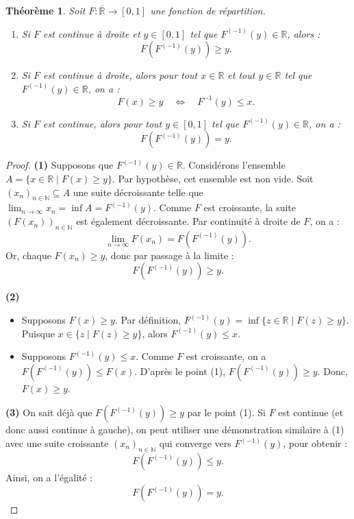 \documentclass[a4paper,11pt]{amsbook}
\numberwithin{equation}{chapter}
\newtheorem{theoreme}			     {Théorème}	[chapter]
\theoremstyle{definition}
\begin{document}
\begin{theoreme}\label{thm:quasi}
Soit \( F : \overline{\mathbb{R}} \to [0,1] \) une fonction de répartition.

\begin{enumerate}
    \item Si \( F \) est continue à droite et \( y \in [0,1] \) tel que \( F^{(-1)}(y) \in \mathbb{R} \), alors :
    \[
    F(F^{(-1)}(y)) \geq y.
    \]

    \item Si \( F \) est continue à droite, alors pour tout \( x \in \mathbb{R} \) et tout \( y \in \mathbb{R} \) tel que \( F^{(-1)}(y) \in \mathbb{R} \), on a :
    \[
    F(x) \geq y \quad \Leftrightarrow \quad F^{-1}(y) \leq x.
    \]

    \item Si \( F \) est continue, alors pour tout \( y \in [0,1] \) tel que \( F^{(-1)}(y) \in \mathbb{R} \), on a :
    \[
    F(F^{(-1)}(y)) = y.
    \]
\end{enumerate}
\end{theoreme}

\begin{proof}
\textbf{(1)} Supposons que \( F^{(-1)}(y) \in \mathbb{R} \). Considérons l'ensemble \( A = \{ x \in \mathbb{R} \mid F(x) \geq y \} \). Par hypothèse, cet ensemble est non vide.  
Soit \( (x_n)_{n \in \mathbb{N}} \subseteq A \) une suite décroissante telle que \( \lim_{n \to \infty} x_n = \inf A = F^{(-1)}(y) \).  
Comme \( F \) est croissante, la suite \( (F(x_n))_{n \in \mathbb{N}} \) est également décroissante.  
Par continuité à droite de \( F \), on a :
\[
\lim_{n \to \infty} F(x_n) = F(F^{(-1)}(y)).
\]
Or, chaque \( F(x_n) \geq y \), donc par passage à la limite :
\[
F(F^{(-1)}(y)) \geq y.
\]

\vspace{1em}
\textbf{(2)} 
\begin{itemize}
\item[\( \Rightarrow \)] Supposons \( F(x) \geq y \).  
Par définition, \( F^{(-1)}(y) = \inf\{ z \in \mathbb{R} \mid F(z) \geq y \} \).  
Puisque \( x \in \{ z \mid F(z) \geq y \} \), alors \( F^{(-1)}(y) \leq x \).

\item[\( \Leftarrow \)] Supposons \( F^{(-1)}(y) \leq x \).  
Comme \( F \) est croissante, on a \( F(F^{(-1)}(y)) \leq F(x) \).  
D'après le point (1), \( F(F^{(-1)}(y)) \geq y \).  
Donc, \( F(x) \geq y \).
\end{itemize}

\vspace{1em}
\textbf{(3)} On sait déjà que \( F(F^{(-1)}(y)) \geq y \) par le point (1).  
Si \( F \) est continue (et donc aussi continue à gauche), on peut utiliser une démonstration similaire à (1) avec une suite croissante \( (x_n)_{n \in \mathbb{N}}\) qui converge vers \( F^{(-1)}(y) \), pour obtenir :
\[
F(F^{(-1)}(y)) \leq y.
\]
Ainsi, on a l'égalité :
\[
F(F^{(-1)}(y)) = y.
\]
\end{proof}
\end{document}
